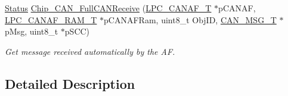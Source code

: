 \begin{DoxyCompactItemize}
\hyperlink{group__LPC__Types__Public__Types_ga67a0db04d321a74b7e7fcfd3f1a3f70b}{Status} \hyperlink{group__CAN__17XX__40XX_ga4029c0d9ce2f898bf911e0e49b570f5b}{Chip\-\_\-\-C\-A\-N\-\_\-\-Full\-C\-A\-N\-Receive} (\hyperlink{structLPC__CANAF__T}{L\-P\-C\-\_\-\-C\-A\-N\-A\-F\-\_\-\-T} $\ast$p\-C\-A\-N\-A\-F, \hyperlink{structLPC__CANAF__RAM__T}{L\-P\-C\-\_\-\-C\-A\-N\-A\-F\-\_\-\-R\-A\-M\-\_\-\-T} $\ast$p\-C\-A\-N\-A\-F\-Ram, uint8\-\_\-t Obj\-I\-D, \hyperlink{structCAN__MSG__T}{C\-A\-N\-\_\-\-M\-S\-G\-\_\-\-T} $\ast$p\-Msg, uint8\-\_\-t $\ast$p\-S\-C\-C)
\begin{DoxyCompactList}\small\item\em Get message received automatically by the A\-F. \end{DoxyCompactList}\end{DoxyCompactItemize}


\subsection{Detailed Description}


